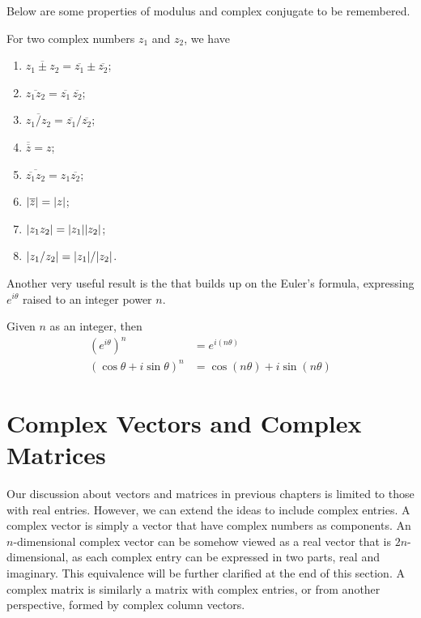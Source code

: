 Below are some properties of modulus and complex conjugate to be remembered.
\begin{proper}
\label{proper:complexnum}
For two complex numbers $z_1$ and $z_2$, we have
\begin{enumerate}[label=(\alph*)]
\item $\overline{z_1 \pm z_2} = \overline{z_1} \pm \overline{z_2}$;
\item $\overline{z_1z_2} = \overline{z_1}\,\overline{z_2}$;
\item $\overline{z_1/z_2} = \overline{z_1}/\overline{z_2}$;
\item $\overline{\overline{z}} = z$;
\item $\overline{\overline{z_1}z_2} = z_1\overline{z_2}$;
\item $\abs{\overline{z}} = \abs{z}$;
\item $\abs{z_1z_2} = \abs{z_1}\abs{z_2}$;
\item $\abs{z_1/z_2} = \abs{z_1}/\abs{z_2}$.
\end{enumerate}
\end{proper}
Another very useful result is the  that builds up on the Euler's formula, expressing $e^{i \theta}$ raised to an integer power $n$.
\begin{thm}
Given $n$ as an integer, then
\begin{subequations}
\begin{align}
(e^{i \theta})^n &= e^{i (n\theta)} \\
(\cos\theta + i \sin\theta)^n &= \cos(n\theta) + i \sin(n\theta)
\end{align}
\end{subequations}
\end{thm}

\section{Complex Vectors and Complex Matrices}

Our discussion about vectors and matrices in previous chapters is limited to those with real entries. However, we can extend the ideas to include complex entries. A complex vector is simply a vector that have complex numbers as components. An $n$-dimensional complex vector can be somehow viewed as a real vector that is $2n$-dimensional, as each complex entry can be expressed in two parts, real and imaginary. This equivalence will be further clarified at the end of this section. A complex matrix is similarly a matrix with complex entries, or from another perspective, formed by complex column vectors.

